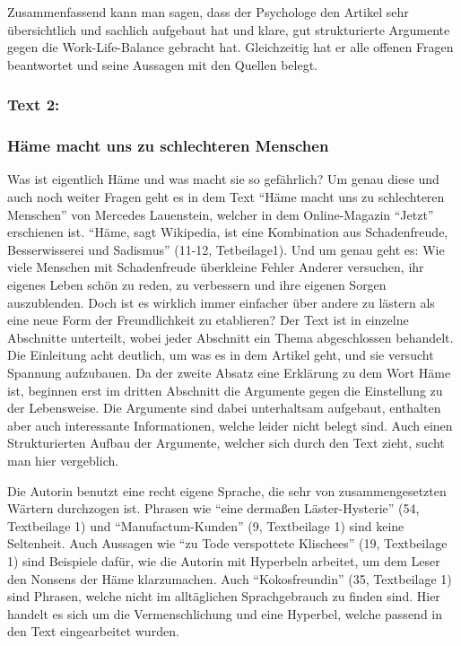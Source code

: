Zusammenfassend kann man sagen, dass der Psychologe den Artikel sehr übersichtlich und sachlich aufgebaut hat und klare, gut strukturierte Argumente gegen die Work-Life-Balance gebracht hat. Gleichzeitig hat er alle offenen Fragen beantwortet und seine Aussagen mit den Quellen belegt. 
\subsubsection{Text 2:}
\subsubsection{Häme macht uns zu schlechteren Menschen }
Was ist eigentlich Häme und was macht sie so gefährlich? Um genau diese und auch noch weiter Fragen geht es in dem Text “Häme macht uns zu schlechteren Menschen” von Mercedes Lauenstein, welcher in dem Online-Magazin “Jetzt” erschienen ist. “Häme, sagt Wikipedia, ist eine Kombination aus Schadenfreude, Besserwisserei und Sadismus” (11-12, Tetbeilage1). Und um genau geht es: Wie viele Menschen mit Schadenfreude überkleine Fehler Anderer versuchen, ihr eigenes Leben schön zu reden, zu verbessern und ihre eigenen Sorgen auszublenden. Doch ist es wirklich immer einfacher über andere zu lästern als eine neue Form der Freundlichkeit zu etablieren? Der Text ist in einzelne Abschnitte unterteilt, wobei jeder Abschnitt ein Thema abgeschlossen behandelt. Die Einleitung acht deutlich, um was es in dem Artikel geht, und sie versucht Spannung aufzubauen. Da der zweite Absatz eine Erklärung zu dem Wort Häme ist, beginnen erst im dritten Abschnitt die Argumente gegen die Einstellung zu der Lebensweise. Die Argumente sind dabei unterhaltsam aufgebaut, enthalten aber auch interessante Informationen, welche leider nicht belegt sind. Auch einen Strukturierten Aufbau der Argumente, welcher sich durch den Text zieht, sucht man hier vergeblich. 

Die Autorin benutzt eine recht eigene Sprache, die sehr von zusammengesetzten Wärtern durchzogen ist. Phrasen wie “eine dermaßen Läster-Hysterie” (54, Textbeilage 1) und “Manufactum-Kunden” (9, Textbeilage 1) sind keine Seltenheit. Auch Aussagen wie “zu Tode verspottete Klischees” (19, Textbeilage 1) sind Beispiele dafür, wie die Autorin mit Hyperbeln arbeitet, um dem Leser den Nonsens der Häme klarzumachen. Auch “Kokosfreundin” (35, Textbeilage 1) sind Phrasen, welche nicht im alltäglichen Sprachgebrauch zu finden sind. Hier handelt es sich um die Vermenschlichung und eine Hyperbel, welche passend in den Text eingearbeitet wurden. 

